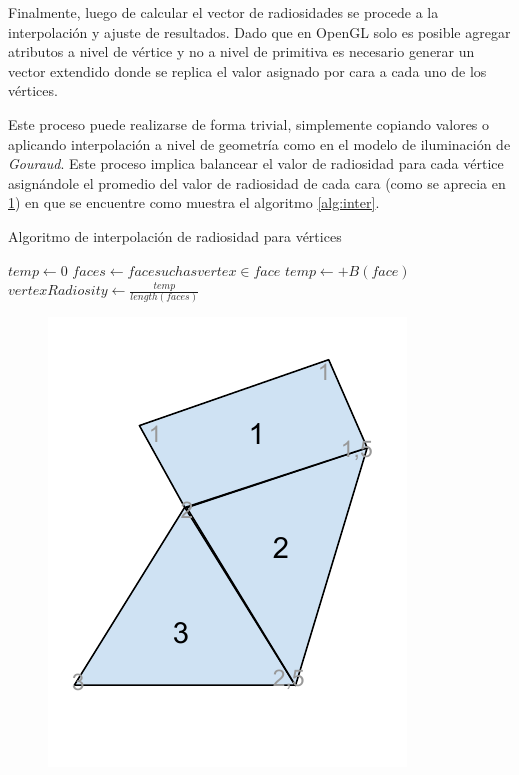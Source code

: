 Finalmente, luego de calcular el vector de radiosidades se procede a la interpolación y ajuste de resultados. Dado que en OpenGL solo es posible agregar atributos a nivel de vértice y no a nivel de primitiva es necesario generar un vector extendido donde se replica el valor asignado por cara a cada uno de los vértices.

Este proceso puede realizarse de forma trivial, simplemente copiando valores o aplicando interpolación a nivel de geometría como en el modelo de iluminación de \textit{Gouraud}. Este proceso implica balancear el valor de radiosidad para cada vértice asignándole el promedio del valor de radiosidad de cada cara (como se aprecia en \ref{img:interpolation}) en que se encuentre como muestra el algoritmo \ref{alg:inter}.

\begin{algorithm}
	\caption{Algoritmo de interpolación de radiosidad para vértices}
	\label{alg:inter}
	\begin{algorithmic}
				\State $temp \gets 0$
				\State $faces \gets {face such as vertex \in face}$
					\State $temp \gets +B(face)$
				\EndLoop
				\State $vertexRadiosity \gets \frac{temp}{length(faces)}$
			\EndLoop
		\EndFunction
	\end{algorithmic}
\end{algorithm}

\begin{figure}[H]
	\centering
	\includegraphics[width=.5\linewidth]{assets/Interpolation}
	\label{img:interpolation}
\end{figure}

